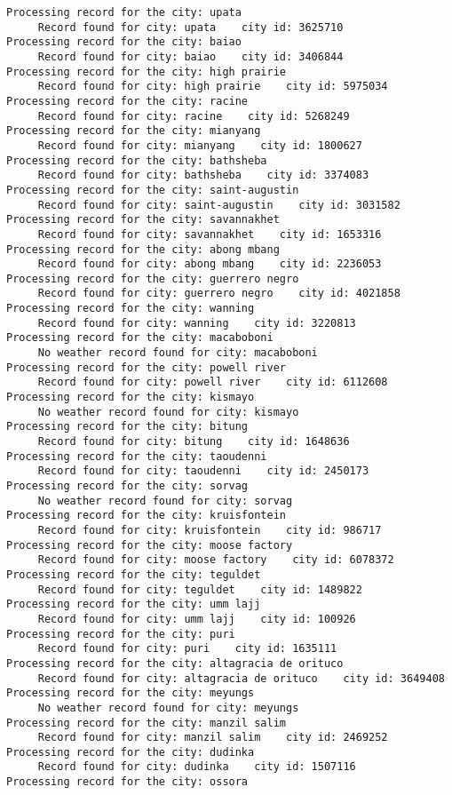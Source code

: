 \documentclass[11pt]{article}
\begin{document}
\begin{Verbatim}[commandchars=\\\{\}]
Processing record for the city: upata
     Record found for city: upata    city id: 3625710
Processing record for the city: baiao
     Record found for city: baiao    city id: 3406844
Processing record for the city: high prairie
     Record found for city: high prairie    city id: 5975034
Processing record for the city: racine
     Record found for city: racine    city id: 5268249
Processing record for the city: mianyang
     Record found for city: mianyang    city id: 1800627
Processing record for the city: bathsheba
     Record found for city: bathsheba    city id: 3374083
Processing record for the city: saint-augustin
     Record found for city: saint-augustin    city id: 3031582
Processing record for the city: savannakhet
     Record found for city: savannakhet    city id: 1653316
Processing record for the city: abong mbang
     Record found for city: abong mbang    city id: 2236053
Processing record for the city: guerrero negro
     Record found for city: guerrero negro    city id: 4021858
Processing record for the city: wanning
     Record found for city: wanning    city id: 3220813
Processing record for the city: macaboboni
     No weather record found for city: macaboboni
Processing record for the city: powell river
     Record found for city: powell river    city id: 6112608
Processing record for the city: kismayo
     No weather record found for city: kismayo
Processing record for the city: bitung
     Record found for city: bitung    city id: 1648636
Processing record for the city: taoudenni
     Record found for city: taoudenni    city id: 2450173
Processing record for the city: sorvag
     No weather record found for city: sorvag
Processing record for the city: kruisfontein
     Record found for city: kruisfontein    city id: 986717
Processing record for the city: moose factory
     Record found for city: moose factory    city id: 6078372
Processing record for the city: teguldet
     Record found for city: teguldet    city id: 1489822
Processing record for the city: umm lajj
     Record found for city: umm lajj    city id: 100926
Processing record for the city: puri
     Record found for city: puri    city id: 1635111
Processing record for the city: altagracia de orituco
     Record found for city: altagracia de orituco    city id: 3649408
Processing record for the city: meyungs
     No weather record found for city: meyungs
Processing record for the city: manzil salim
     Record found for city: manzil salim    city id: 2469252
Processing record for the city: dudinka
     Record found for city: dudinka    city id: 1507116
Processing record for the city: ossora

\end{Verbatim}
\end{document}
